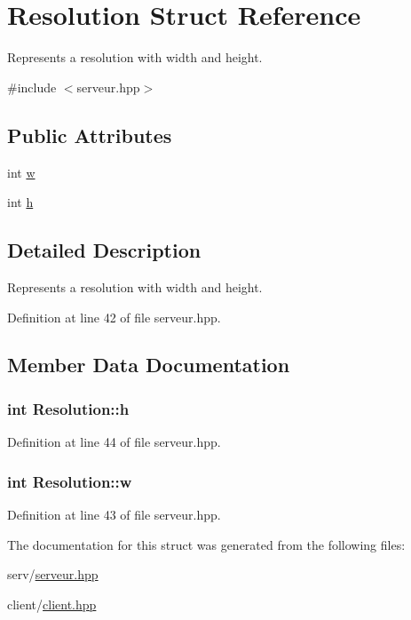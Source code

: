 \hypertarget{structResolution}{\section{Resolution Struct Reference}
\label{structResolution}
}


Represents a resolution with width and height.  




{\ttfamily \#include $<$serveur.\-hpp$>$}

\subsection*{Public Attributes}
\begin{DoxyCompactItemize}
\item 
int \hyperlink{structResolution_a453cb3f69972227dcdcdfb48cbc1117d}{w}
\item 
int \hyperlink{structResolution_a14e6daa40708fda03b29ef13ecad6cb8}{h}
\end{DoxyCompactItemize}


\subsection{Detailed Description}
Represents a resolution with width and height. 

Definition at line 42 of file serveur.\-hpp.



\subsection{Member Data Documentation}
\hypertarget{structResolution_a14e6daa40708fda03b29ef13ecad6cb8}{
\subsubsection[{h}]{\setlength{\rightskip}{0pt plus 5cm}int Resolution\-::h}}\label{structResolution_a14e6daa40708fda03b29ef13ecad6cb8}


Definition at line 44 of file serveur.\-hpp.

\hypertarget{structResolution_a453cb3f69972227dcdcdfb48cbc1117d}{
\subsubsection[{w}]{\setlength{\rightskip}{0pt plus 5cm}int Resolution\-::w}}\label{structResolution_a453cb3f69972227dcdcdfb48cbc1117d}


Definition at line 43 of file serveur.\-hpp.



The documentation for this struct was generated from the following files\-:\begin{DoxyCompactItemize}
\item 
serv/\hyperlink{serveur_8hpp}{serveur.\-hpp}\item 
client/\hyperlink{client_8hpp}{client.\-hpp}\end{DoxyCompactItemize}
